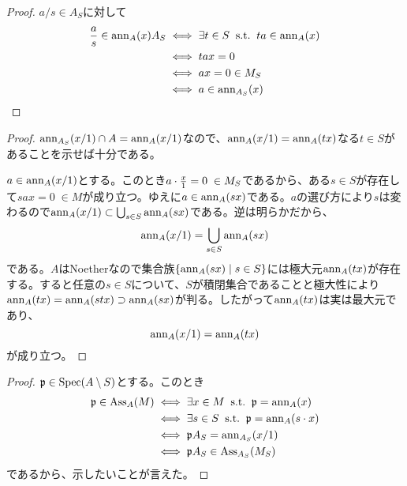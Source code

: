 
\begin{proof}
  $a/s \in A_S$に対して
  \begin{align*}
    \frac{a}{s} \in \operatorname{ann}_A(x) A_S &\iff \exists t \in S \; \; \text{s.t.} \; \; ta \in \operatorname{ann}_A(x) \\
    &\iff tax = 0 \\
    &\iff ax = 0 \in M_S \\
    &\iff a \in \operatorname{ann}_{A_S}(x)
  \end{align*}
\end{proof}






\begin{proof}
  $\operatorname{ann}_{A_S}(x/1) \cap A = \operatorname{ann}_A(x/1)$なので、$\operatorname{ann}_A(x/1) = \operatorname{ann}_A(tx)$なる$t \in S$があることを示せば十分である。

  $a \in \operatorname{ann}_A(x/1)$とする。このとき$a \cdot \frac{x}{1} = 0 \; \in  M_S$であるから、ある$s \in S$が存在して$sax=0 \; \in M$が成り立つ。ゆえに$a \in \operatorname{ann}_A(sx)$である。$a$の選び方により$s$は変わるので$\operatorname{ann}_A(x/1) \subset \bigcup_{s \in S} \operatorname{ann}_A(sx)$である。逆は明らかだから、
  \[
  \operatorname{ann}_A(x/1) = \bigcup_{s \in S} \operatorname{ann}_A(sx)
  \]
  である。$A$はNoetherなので集合族$\left\{ \operatorname{ann}_A(sx) \mathrel{} \middle| \mathrel{} s \in S \right\}$には極大元$\operatorname{ann}_A(tx)$が存在する。すると任意の$s \in S$について、$S$が積閉集合であることと極大性により$\operatorname{ann}_A(tx) = \operatorname{ann}_A(stx) \supset \operatorname{ann}_A(sx)$が判る。したがって$\operatorname{ann}_A(tx)$は実は最大元であり、
  \[
  \operatorname{ann}_A(x/1) = \operatorname{ann}_A(tx)
  \]
  が成り立つ。
\end{proof}



\begin{proof}
  $\mathfrak{p} \in \operatorname{Spec} (A \setminus S)$とする。このとき
  \begin{align*}
    \mathfrak{p} \in \operatorname{Ass}_A(M) &\iff \exists x \in M \; \; \text{s.t.} \; \; \mathfrak{p} = \operatorname{ann}_A(x) \\
    &\iff \exists s \in S \; \; \text{s.t.} \; \; \mathfrak{p} = \operatorname{ann}_A(s \cdot x) \\
    &\iff \mathfrak{p} A_S = \operatorname{ann}_{A_S}(x/1) \\
    &\iff \mathfrak{p} A_S \in \operatorname{Ass}_{A_S}(M_S)
  \end{align*}
  であるから、示したいことが言えた。
\end{proof}


